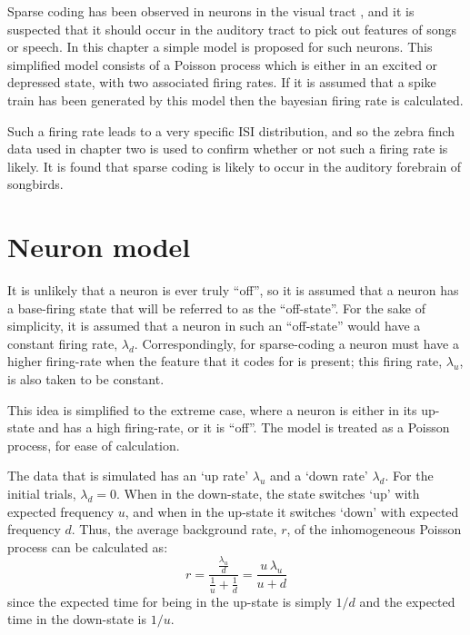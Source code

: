 Sparse coding has been observed in neurons in the visual tract \citep{OlshausenField2004a}, and it is suspected that it should occur in the auditory tract to pick out features of songs or speech.  In this chapter a simple model is proposed for such neurons.  This simplified model consists of a Poisson process which is either in an excited or depressed state, with two associated firing rates.  If it is assumed that a spike train has been generated by this model then the bayesian firing rate is calculated.

Such a firing rate leads to a very specific ISI distribution, and so the zebra finch data used in chapter two is used to confirm whether or not such a firing rate is likely.  It is found that sparse coding is likely to occur in the auditory forebrain of songbirds.

\section{Neuron model}
It is unlikely that a neuron is ever truly ``off'', so it is assumed that a neuron has a base-firing state that will be referred to as the ``off-state''.  For the sake of simplicity, it is assumed that a neuron in such an ``off-state'' would have a constant firing rate, $\lambda_d$.  Correspondingly, for sparse-coding a neuron must have a higher firing-rate when the feature that it codes for is present; this firing rate, $\lambda_u$, is also taken to be constant.


This idea is simplified to the extreme case, where a neuron is either in its up-state and has a high firing-rate, or it is ``off''.   The model is treated as a Poisson process, for ease of calculation.


The data that is simulated has an \lq{}up rate\rq{} $\lambda_u$ and a \lq{}down rate\rq{} $\lambda_d$.  For the initial trials, $\lambda_d = 0$.  When in the down-state, the state switches \lq{}up\rq{} with expected frequency $u$, and when in the up-state it switches \lq{}down\rq{} with expected frequency $d$.  Thus, the average background rate, $r$, of the inhomogeneous Poisson process can be calculated as:
\begin{equation}\label{lam}
r = \frac{ \frac{\lambda_u }{d}}{ \frac{1}{u} + \frac{1}{d}} = \frac{u\, \lambda_u}{u+d}
\end{equation}
since the expected time for being in the up-state is simply $1/d$ and the expected time in the down-state is $1/u$.

